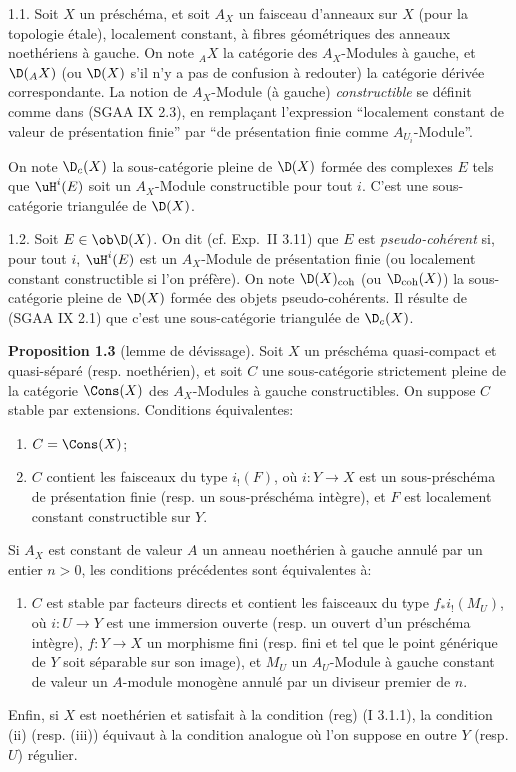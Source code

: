 1.1. Soit $X$ un préschéma, et soit $A_X$ un faisceau d'anneaux sur $X$ (pour la topologie étale), localement constant, à fibres géométriques des anneaux noethériens à gauche. On note ${}_A X$ la catégorie des $A_X$-Modules à gauche, et $\D({}_A X)$ (ou $\D(X)$ s'il n'y a pas de confusion à redouter) la catégorie dérivée correspondante. La notion de $A_X$-Module (à gauche) \emph{constructible} se définit comme dans (SGAA IX 2.3), en remplaçant l'expression ``localement constant de valeur de présentation finie'' par ``de présentation finie comme $A_{U_i}$-Module''.

On note $\D_c(X)$ la sous-catégorie pleine de $\D(X)$ formée des complexes $E$ tels que $\uH^i(E)$ soit un $A_X$-Module constructible pour tout $i$. C'est une sous-catégorie triangulée de $\D(X)$.

1.2.
Soit $E\in\ob\D(X)$. On dit (cf. Exp.~II 3.11) que $E$ est \emph{pseudo-cohérent} si, pour tout $i$, $\uH^i(E)$ est un $A_X$-Module de présentation finie (ou localement constant constructible si l'on préfère). On note $\D(X)_{\mathrm{coh}}$ (ou $\D_{\mathrm{coh}}(X)$) la sous-catégorie pleine de $\D(X)$ formée des objets pseudo-cohérents. Il résulte de (SGAA IX 2.1) que c'est une sous-catégorie triangulée de $\D_c(X)$.

\textbf{Proposition 1.3} (lemme de dévissage). Soit $X$ un préschéma quasi-compact et quasi-séparé (resp. noethérien), et soit $C$ une sous-catégorie strictement pleine de la catégorie $\Cons(X)$ des $A_X$-Modules à gauche constructibles. On suppose $C$ stable par extensions. Conditions équivalentes:
\begin{enumerate}[label=(\roman*)]
\item $C=\Cons(X)$;
\item $C$ contient les faisceaux du type $i_!(F)$, où $i:Y\to X$ est un sous-préschéma de présentation finie (resp. un sous-préschéma intègre), et $F$ est localement constant constructible sur $Y$.
\end{enumerate}
Si $A_X$ est constant de valeur $A$ un anneau noethérien à gauche annulé par un entier $n>0$, les conditions précédentes sont équivalentes à:
\begin{enumerate}[label=(\roman*),start=3]
\item $C$ est stable par facteurs directs et contient les faisceaux du type $f_*i_!(M_U)$, où $i:U\to Y$ est une immersion ouverte (resp. un ouvert d'un préschéma intègre), $f:Y\to X$ un morphisme fini (resp. fini et tel que le point générique de $Y$ soit séparable sur son image), et $M_U$ un $A_U$-Module à gauche constant de valeur un $A$-module monogène annulé par un diviseur premier de $n$.
\end{enumerate}
Enfin, si $X$ est noethérien et satisfait à la condition (reg) (I 3.1.1), la condition (ii) (resp. (iii)) équivaut à la condition analogue 
où l'on
suppose en outre $Y$ (resp. $U$) régulier.

